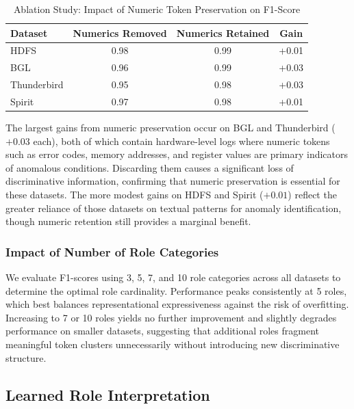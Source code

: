 \begin{table}[t]
\centering
\caption{Ablation Study: Impact of Numeric Token Preservation on F1-Score}
\label{tab:ablation_numeric}
\begin{tabular}{@{}lccc@{}}
\toprule
\textbf{Dataset} & \textbf{Numerics Removed} & \textbf{Numerics Retained} & \textbf{Gain} \\
\midrule
HDFS        & 0.98 & 0.99 & +0.01 \\
BGL         & 0.96 & 0.99 & +0.03 \\
Thunderbird & 0.95 & 0.98 & +0.03 \\
Spirit      & 0.97 & 0.98 & +0.01 \\
\bottomrule
\end{tabular}
\end{table}

The largest gains from numeric preservation occur on BGL and Thunderbird ($+0.03$ each), both of which contain hardware-level logs where numeric tokens such as error codes, memory addresses, and register values are primary indicators of anomalous conditions. Discarding them causes a significant loss of discriminative information, confirming that numeric preservation is essential for these datasets. The more modest gains on HDFS and Spirit ($+0.01$) reflect the greater reliance of those datasets on textual patterns for anomaly identification, though numeric retention still provides a marginal benefit.

\subsubsection{Impact of Number of Role Categories}

We evaluate F1-scores using 3, 5, 7, and 10 role categories across all datasets to determine the optimal role cardinality. Performance peaks consistently at 5 roles, which best balances representational expressiveness against the risk of overfitting. Increasing to 7 or 10 roles yields no further improvement and slightly degrades performance on smaller datasets, suggesting that additional roles fragment meaningful token clusters unnecessarily without introducing new discriminative structure.

\subsection{Learned Role Interpretation}


